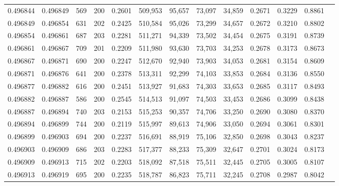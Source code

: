 \begin{tabular}{rrrrrrrrrrrrr}
0.496844 & 0.496849 &   569 & 200 &                                     0.2601 & 509,953 &  95,657 &  73,097 &  34,859 & 0.2671 & 0.3229 & 0.8861 \\
0.496849 & 0.496854 &   631 & 202 &                                     0.2425 & 510,584 &  95,026 &  73,299 &  34,657 & 0.2672 & 0.3210 & 0.8802 \\
0.496854 & 0.496861 &   687 & 203 &                                     0.2281 & 511,271 &  94,339 &  73,502 &  34,454 & 0.2675 & 0.3191 & 0.8739 \\
0.496861 & 0.496867 &   709 & 201 &                                     0.2209 & 511,980 &  93,630 &  73,703 &  34,253 & 0.2678 & 0.3173 & 0.8673 \\
0.496867 & 0.496871 &   690 & 200 &                                     0.2247 & 512,670 &  92,940 &  73,903 &  34,053 & 0.2681 & 0.3154 & 0.8609 \\
0.496871 & 0.496876 &   641 & 200 &                                     0.2378 & 513,311 &  92,299 &  74,103 &  33,853 & 0.2684 & 0.3136 & 0.8550 \\
0.496877 & 0.496882 &   616 & 200 &                                     0.2451 & 513,927 &  91,683 &  74,303 &  33,653 & 0.2685 & 0.3117 & 0.8493 \\
0.496882 & 0.496887 &   586 & 200 &                                     0.2545 & 514,513 &  91,097 &  74,503 &  33,453 & 0.2686 & 0.3099 & 0.8438 \\
0.496887 & 0.496894 &   740 & 203 &                                     0.2153 & 515,253 &  90,357 &  74,706 &  33,250 & 0.2690 & 0.3080 & 0.8370 \\
0.496894 & 0.496899 &   744 & 200 &                                     0.2119 & 515,997 &  89,613 &  74,906 &  33,050 & 0.2694 & 0.3061 & 0.8301 \\
0.496899 & 0.496903 &   694 & 200 &                                     0.2237 & 516,691 &  88,919 &  75,106 &  32,850 & 0.2698 & 0.3043 & 0.8237 \\
0.496903 & 0.496909 &   686 & 203 &                                     0.2283 & 517,377 &  88,233 &  75,309 &  32,647 & 0.2701 & 0.3024 & 0.8173 \\
0.496909 & 0.496913 &   715 & 202 &                                     0.2203 & 518,092 &  87,518 &  75,511 &  32,445 & 0.2705 & 0.3005 & 0.8107 \\
0.496913 & 0.496919 &   695 & 200 &                                     0.2235 & 518,787 &  86,823 &  75,711 &  32,245 & 0.2708 & 0.2987 & 0.8042 \\

\end{tabular}
